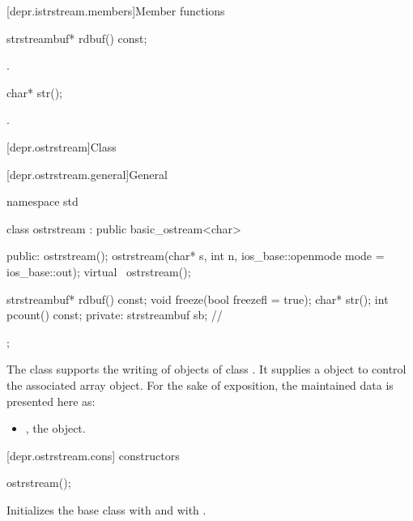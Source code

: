 [depr.istrstream.members]{Member functions}

%
\begin{itemdecl}
strstreambuf* rdbuf() const;
\end{itemdecl}

\begin{itemdescr}
\pnum
\returns
{}.
\end{itemdescr}

%
\begin{itemdecl}
char* str();
\end{itemdecl}

\begin{itemdescr}
\pnum
\returns
{}.
\end{itemdescr}

[depr.ostrstream]{Class }

[depr.ostrstream.general]{General}

%
\begin{codeblock}
namespace std {
  class ostrstream : public basic_ostream<char> {
  public:
    ostrstream();
    ostrstream(char* s, int n, ios_base::openmode mode = ios_base::out);
    virtual ~ostrstream();

    strstreambuf* rdbuf() const;
    void freeze(bool freezefl = true);
    char* str();
    int pcount() const;
  private:
    strstreambuf sb;            // \expos
  };
}
\end{codeblock}

\pnum
The class
supports the writing of objects of class
.
It supplies a
object to control the associated array object.
For the sake of exposition, the maintained data is presented here as:

\begin{itemize}
\item
{}, the  object.
\end{itemize}

[depr.ostrstream.cons]{ constructors}

%
\begin{itemdecl}
ostrstream();
\end{itemdecl}

\begin{itemdescr}
\pnum
\effects
Initializes the base class with  and
 with .
\end{itemdescr}

